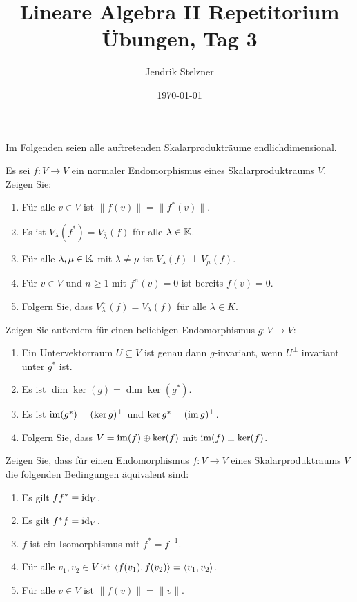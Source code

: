 \documentclass[a4paper, 10pt]{scrartcl}
\title{Lineare Algebra II Repetitorium \\ Übungen, Tag 3}
\author{Jendrik Stelzner}
\date{\today}
\begin{document}
\maketitle


Im Folgenden seien alle auftretenden Skalarprodukträume endlichdimensional.


\begin{question}
  Es sei $f \colon V \to V$ ein normaler Endomorphismus eines Skalarproduktraums $V$.
  Zeigen Sie:
  \begin{enumerate}[leftmargin=*]
    \item
      Für alle $v \in V$ ist $\|f(v)\| = \|f^*(v)\|$.
    \item
      Es ist $V_\lambda(f^*) = V_{\overline{\lambda}}(f)$ für alle $\lambda \in \mathbb{K}$.
    \item
      Für alle $\lambda, \mu \in \mathbb{K}$ mit $\lambda \neq \mu$ ist $V_\lambda(f) \perp V_\mu(f)$.
    \item
      Für $v \in V$ und $n \geq 1$ mit $f^n(v) = 0$ ist bereits $f(v) = 0$.
    \item
      Folgern Sie, dass $V^\sim_\lambda(f) = V_\lambda(f)$ für alle $\lambda \in K$.
  \end{enumerate}
  Zeigen Sie außerdem für einen beliebigen Endomorphismus $g \colon V \to V$:
  \begin{enumerate}[leftmargin=*, resume]
    \item
      Ein Untervektorraum $U \subseteq V$ ist genau dann $g$-invariant, wenn $U^\perp$ invariant unter $g^*$ ist.
    \item
      Es ist $\dim \ker(g) = \dim \ker(g^*)$.
    \item
      Es ist $\operatorname{im}(g^*) = (\ker g)^\perp$ und $\ker g^* = (\operatorname{im} g)^\perp$.
    \item
      Folgern Sie, dass $V = \operatorname{im}(f) \oplus \ker(f)$ mit $\operatorname{im}(f) \perp \ker(f)$.
  \end{enumerate}
\end{question}


\begin{question}
  Zeigen Sie, dass für einen Endomorphismus $f \colon V \to V$ eines Skalarproduktraums $V$ die folgenden Bedingungen äquivalent sind:
  \begin{enumerate}[leftmargin=*]
    \item
      Es gilt $f f^* = \operatorname{id}_V$.
    \item
      Es gilt $f^* f = \operatorname{id}_V$.
    \item
      $f$ ist ein Isomorphismus mit $f^* = f^{-1}$.
    \item
      Für alle $v_1, v_2 \in V$ ist $\left\langle f(v_1), f(v_2) \right\rangle = \left\langle v_1, v_2 \right\rangle$.
    \item
      Für alle $v \in V$ ist $\|f(v)\| = \|v\|$.
  \end{enumerate}
\end{question}
\end{document}
